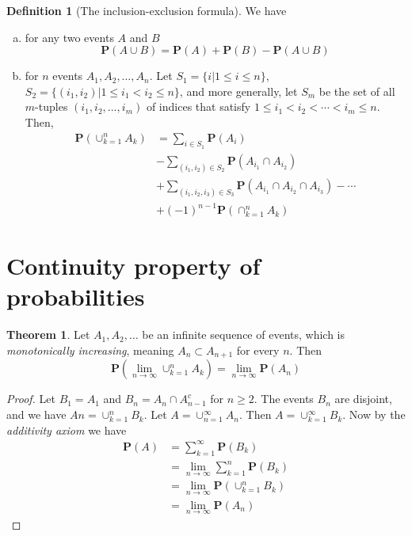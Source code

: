 \documentclass{tufte-handout}
\theoremstyle{definition} \newtheorem{definition}{Definition}
\newtheorem{theorem}{Theorem}
\theoremstyle{remark} \newtheorem{remark}{Remark}
\newcommand{\prob}[1]{\mathbf{P}\left(#1\right)}
\begin{document}
\begin{definition}[The inclusion-exclusion formula]
  We have
  \begin{enumerate}[(a)]
  \item for any two events $A$ and $B$
    \begin{equation*}
      \prob{A \cup B} = \prob{A} + \prob{B} - \prob{A \cup B}
    \end{equation*}
  \item for $n$ events $A_1, A_2, \ldots, A_n$. Let
    $S_1 = \{i | 1 \leq i \leq n\}$, $S_2 = \{(i_1, i_2) |
    1 \leq i_1 < i_2 \leq n\}$, and more generally, let $S_m$ be the set
    of all $m$-tuples $(i_1, i_2, \ldots, i_m)$ of indices that satisfy
    $1 \leq i_1 < i_2 < \cdots < i_m \leq n$. Then,
    \begin{align*}
      \prob{\cup_{k=1}^n A_k} & = \sum_{i \in S_1}\prob{A_i} \\
                              & - \sum_{(i_1, i_2) \in S_2}\prob{A_{i_1}
                                \cap A_{i_2}} \\
                              & + \sum_{(i_1, i_2, i_3) \in S_3}
                                \prob{A_{i_1} \cap A_{i_2} \cap A_{i_3}}
                                - \cdots \\
                              & + {(-1)}^{n - 1} \prob{\cap_{k=1}^n A_k}
      \end{align*}
    \end{enumerate}
\end{definition}

\section{Continuity property of probabilities}
\begin{theorem}
  Let $A_1, A_2, \ldots$ be an infinite sequence of events, which is
  \emph{monotonically increasing}, meaning $A_n \subset A_{n+1}$ for every
  $n$. Then
  \begin{equation*}
    \prob{\lim_{n \to \infty} \cup_{k=1}^n A_k} =
    \lim_{n \to \infty} \prob{A_n}
  \end{equation*}
\end{theorem}

\begin{proof}
  Let $B_1 = A_1$ and $B_n = A_n\cap A_{n-1}^c$ for $n \geq 2$. The events
  $B_n$ are disjoint, and we have $An = \cup_{k=1}^n B_k$. Let $A =
  \cup_{n=1}^\infty A_n$. Then $A = \cup_{k=1}^{\infty} B_k$. Now by the
  \emph{additivity axiom} we have
  \begin{align*}
    \prob{A} & = \sum_{k=1}^\infty \prob{B_k} \\
             & = \lim_{n \to \infty} \sum_{k=1}^n \prob{B_k} \\
             & = \lim_{n \to \infty} \prob{\cup_{k=1}^n B_k} \\
             & = \lim_{n \to \infty} \prob{A_n}
  \end{align*}
\end{proof}
\end{document}
